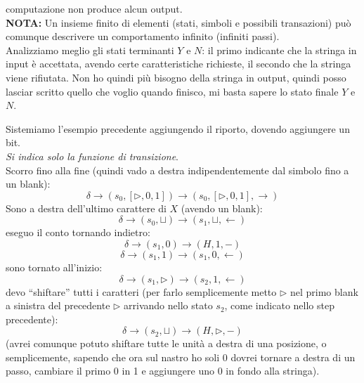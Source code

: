 computazione non produce alcun output. \\
\textbf{NOTA:} Un insieme finito di
  elementi (stati, simboli e possibili transazioni) può comunque descrivere un
  comportamento infinito (infiniti passi).\\ 
Analizziamo meglio gli stati terminanti $Y$ e $N$: il primo indicante che la
stringa in input è accettata, avendo certe caratteristiche richieste, il secondo
che la stringa viene rifiutata. Non ho quindi più bisogno della stringa in
output, quindi posso lasciar scritto quello che voglio quando finisco, mi basta
sapere lo stato finale $Y$ e $N$.
\begin{esempio}
  Sistemiamo l'esempio precedente aggiungendo il riporto, dovendo aggiungere un
  bit. \\
 \textit{Si indica solo la funzione di transizione}.\\
  Scorro fino alla fine (quindi vado a destra indipendentemente dal simbolo fino
  a un blank):
  \[\delta\to(s_0,[\triangleright, 0,1])\to(s_0,[\triangleright, 0,1],
    \rightarrow)\]
  Sono a destra dell'ultimo carattere di $X$ (avendo un blank):
  \[\delta\to(s_0,\sqcup)\to(s_1,\sqcup,\leftarrow)\]
  eseguo il conto tornando indietro:
  \[\delta\to(s_1,0)\to(H,1,-)\]
  \[\delta\to(s_1,1)\to(s_1,0,\leftarrow)\]
  sono tornato all'inizio:
  \[\delta\to(s_1,\triangleright)\to(s_2,1,\leftarrow)\]
  devo ``shiftare'' tutti i caratteri (per farlo semplicemente metto
  $\triangleright$ nel primo blank a sinistra del precedente $\triangleright$
  arrivando nello stato $s_2$, come indicato nello step precedente):
  \[\delta\to(s_2,\sqcup)\to(H,\triangleright,-)\]
  (avrei comunque potuto shiftare tutte le unità a destra di una posizione, o
  semplicemente, sapendo che ora sul nastro ho soli 0 dovrei tornare a destra di
  un passo, cambiare il primo 0 in 1 e aggiungere uno 0 in fondo alla
  stringa).
\end{esempio}
